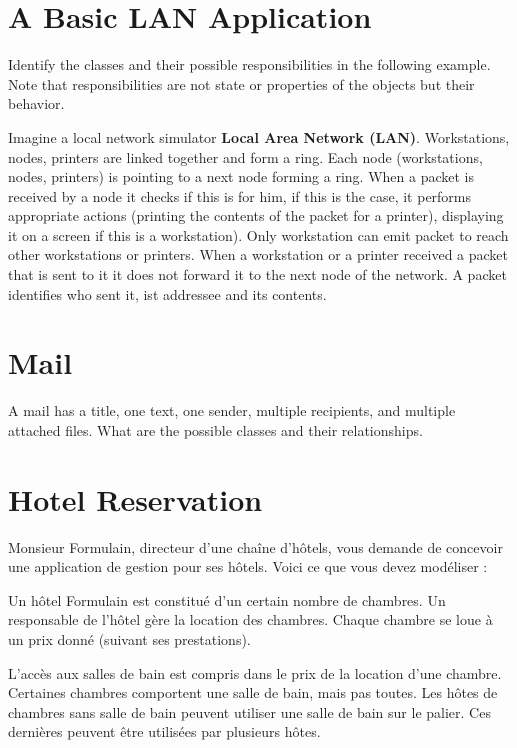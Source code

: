 \section{A Basic LAN Application}

Identify the classes and their possible responsibilities in the following example. Note that responsibilities are not state or properties of the objects but their behavior.

Imagine a local network simulator \textbf{Local Area Network (LAN)}. Workstations, nodes, printers are linked together and form a ring. Each node (workstations, nodes, printers) is pointing to a next node forming a ring. When a packet is received by a node it checks if this is for him, if this is the case, it performs appropriate actions (printing the contents of the packet for a printer), displaying it on a screen if this is a workstation). Only workstation can emit packet to reach other workstations or printers. 
When a workstation or a printer received a packet that is sent to it it does not forward it to the next node of the network.  A packet identifies who sent it, ist addressee and its contents. 




\section{Mail}
A mail has a title, one text, one sender, multiple recipients, and multiple attached files. What are the possible classes and their relationships.

\section{Hotel Reservation}

Monsieur Formulain, directeur d'une cha\^ine d'h\^otels, vous demande de concevoir une application de gestion pour ses h\^otels. Voici ce que vous devez mod\'eliser :

Un h\^otel Formulain est constitu\'e d'un certain nombre de chambres. Un responsable de l'h\^otel g\`ere la location des chambres. Chaque chambre se loue \`a un prix donn\'e (suivant ses prestations).

L'acc\`es aux salles de bain est compris dans le prix de la location d'une chambre. Certaines chambres comportent une salle de bain, mais pas toutes. Les h\^otes de chambres sans salle de bain peuvent utiliser une salle de bain sur le palier. Ces derni\`eres peuvent \^etre utilis\'ees par plusieurs h\^otes.

